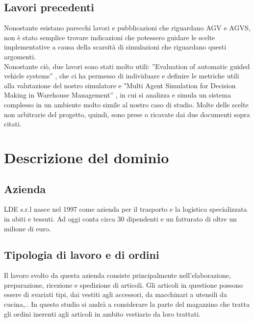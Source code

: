 \documentclass[12pt]{article}
\begin{document}
\subsection{Lavori precedenti}
Nonostante esistano parecchi lavori e pubblicazioni che riguardano AGV e AGVS, non è stato semplice trovare indicazioni che potessero guidare le scelte implementative a causa della scarsità di simulazioni che riguardano questi argomenti.\\

\noindent Nonostante ciò, due lavori sono stati molto utili:  ”Evaluation of automatic guided vehicle systems” \cite{EvaluationAGVS}, che ci ha permesso di individuare e definire le metriche utili alla valutazione del nostro simulatore e "Multi Agent Simulation for Decision Making in Warehouse Management” \cite{MAS_Warehouse}, in cui si analizza e simula un sistema complesso in un ambiente molto simile al nostro caso di studio.
Molte delle scelte non arbitrarie del progetto, quindi, sono prese o ricavate dai due documenti sopra citati.

\newpage
\section{Descrizione del dominio}
\subsection{Azienda}
LDE s.r.l nasce nel 1997 come azienda per il trasporto e la logistica specializzata in abiti e tessuti. Ad oggi conta circa 30 dipendenti e un fatturato di oltre un milione di euro.

\subsection{Tipologia di lavoro e di ordini}
Il lavoro svolto da questa azienda consiste principalmente nell'elaborazione, preparazione, ricezione e spedizione di articoli. Gli articoli in questione possono essere di svariati tipi, dai vestiti agli accessori, da macchinari a utensili da cucina,..
In questo studio si andrà a considerare la parte del magazzino che tratta gli ordini inerenti agli articoli in ambito vestiario da loro trattati.
\end{document}
